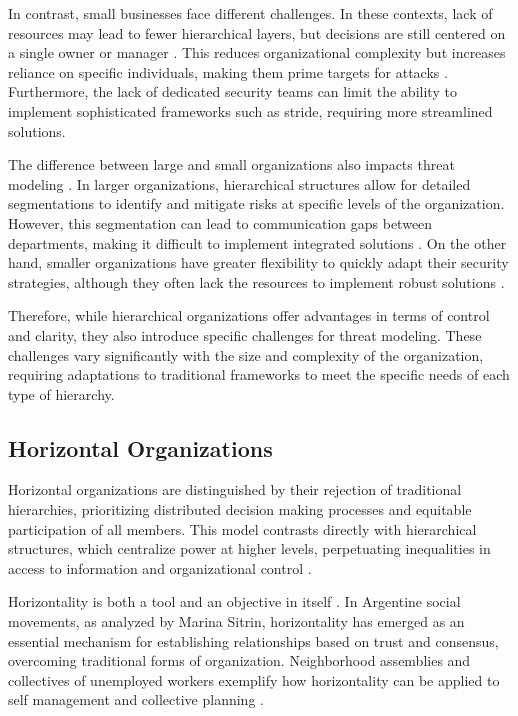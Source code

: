 In contrast, small businesses face different challenges. In these contexts, lack
of resources may lead to fewer hierarchical layers, but decisions are still
centered on a single owner or manager \cite{WorkerCooperativesandRevolution}.
This reduces organizational complexity but increases reliance on specific
individuals, making them prime targets for attacks
\cite{WorkerCooperativesinAmerica}. Furthermore, the lack of dedicated security
teams can limit the ability to implement sophisticated frameworks such as
\gls{stride}, requiring more streamlined solutions.

The difference between large and small organizations also impacts threat
modeling \cite{WorkerCooperativesinAmerica,
ThreatModelingASummaryOfAvailableMethods}. In larger organizations, hierarchical
structures allow for detailed segmentations to identify and mitigate risks at
specific levels of the organization. However, this segmentation can lead to
communication gaps between departments, making it difficult to implement
integrated solutions \cite{ThreatModelingASystematicLiteratureReview}. On the
other hand, smaller organizations have greater flexibility to quickly adapt
their security strategies, although they often lack the resources to implement
robust solutions \cite{WorkerCooperativesandRevolution}.

Therefore, while hierarchical organizations offer advantages in terms of control
and clarity, they also introduce specific challenges for threat modeling. These
challenges vary significantly with the size and complexity of the organization,
requiring adaptations to traditional frameworks to meet the specific needs of
each type of hierarchy.

\subsection{Horizontal Organizations}
\label{subsec:horizontal_organizations}

Horizontal organizations are distinguished by their rejection of traditional
hierarchies, prioritizing distributed decision making processes and equitable
participation of all members. This model contrasts directly with hierarchical
structures, which centralize power at higher levels, perpetuating inequalities
in access to information and organizational control \cite{Non-HierarchicalForms}.

Horizontality is both a tool and an objective in itself \cite{Colbac}. In
Argentine social movements, as analyzed by Marina Sitrin, horizontality has
emerged as an essential mechanism for establishing relationships based on trust
and consensus, overcoming traditional forms of organization. Neighborhood
assemblies and collectives of unemployed workers exemplify how horizontality can
be applied to self management and collective planning
\cite{EverydayRevolutions}.

